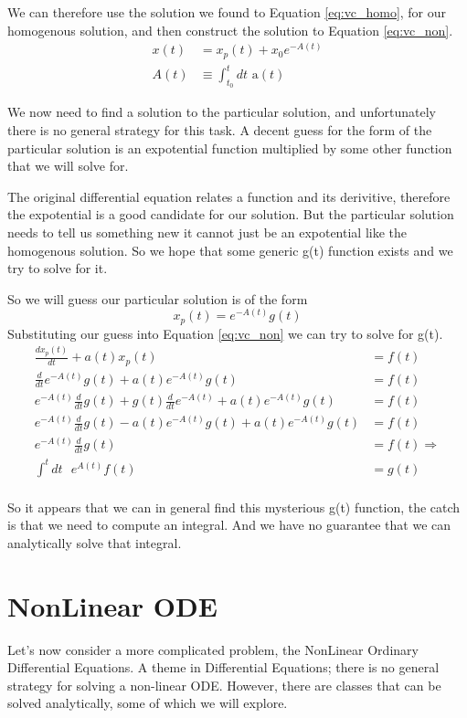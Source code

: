 \documentclass{article}
\newcommand{\be}{\begin{equation}}
\newcommand{\ee}{\end{equation}}
\begin{document}
We can therefore use the solution we found to Equation \ref{eq:vc_homo}, for our homogenous solution, and then construct the solution to Equation \ref{eq:vc_non}.
\be
\begin{split}
    x(t) &= x_p(t) + x_0 e^{-A(t)}\\
    A(t) & \equiv \int_{t_0}^t dt \text{ a}(t)
\end{split}
\ee

We now need to find a solution to the particular solution, and unfortunately there is no general strategy for this task.
A decent guess for the form of the particular solution is an expotential function multiplied by some other function that we will solve for.

The original differential equation relates a function and its derivitive, therefore the expotential is a good candidate for our solution.
But the particular solution needs to tell us something new it cannot just be an expotential like the homogenous solution.
So we hope that some generic g(t) function exists and we try to solve for it.

So we will guess our particular solution is of the form
\be
x_p(t) = e^{-A(t)}g(t)
\ee
Substituting our guess into Equation \ref{eq:vc_non} we can try to solve for g(t).
\be
\begin{split}
    \frac{dx_p(t)}{dt} + a(t) x_p(t) &= f(t) \\
    \frac{d}{dt} e^{-A(t)}g(t) + a(t)  e^{-A(t)}g(t) &= f(t)\\
    e^{-A(t)} \frac{d}{dt} g(t) + g(t) \frac{d}{dt} e^{-A(t)} + a(t)  e^{-A(t)}g(t) &= f(t)\\
    e^{-A(t)} \frac{d}{dt} g(t) -a(t) e^{-A(t)} g(t) + a(t)  e^{-A(t)}g(t) &= f(t)\\
    e^{-A(t)} \frac{d}{dt} g(t) &= f(t) \Rightarrow \\
    \int^t dt \text{ }e^{A(t)} f(t) &= g(t) \\
\end{split}
\ee

So it appears that we can in general find this mysterious g(t) function, the catch is that we need to compute an integral. 
And we have no guarantee that we can analytically solve that integral. 

\section*{NonLinear ODE}
Let's now consider a more complicated problem, the NonLinear Ordinary Differential Equations.
A theme in Differential Equations; there is no general strategy for solving a non-linear ODE.
However, there are classes that can be solved analytically, some of which we will explore. 
\end{document}
